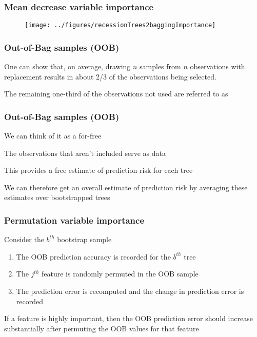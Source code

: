\documentclass[12pt]{beamer}
\begin{document}
\begin{frame}[fragile]
\frametitle{Mean decrease variable importance}

\begin{figure}
\centering
\texttt{[image: ../figures/recessionTrees2baggingImportance]}
\end{figure}
\end{frame}

\begin{frame}
\frametitle{Out-of-Bag samples (OOB)}
One can show that, on average, drawing $n$ samples from $n$ observations with replacement  results
in about 2/3 of the observations being selected.

\vsp
The remaining one-third of the observations not used are referred to as 
\end{frame}

\begin{frame}
\frametitle{Out-of-Bag samples (OOB)}


We can think of it as a for-free 


\vsp
The observations that aren't included serve as  data

\vsp
This provides a free estimate of prediction risk for each tree

\vsp
We can therefore get an overall estimate of prediction risk by averaging these estimates over  bootstrapped trees
\end{frame}


\begin{frame}[fragile]
\frametitle{Permutation variable importance}
Consider the $b^{th}$ bootstrap sample

\begin{enumerate}
\item The OOB prediction accuracy is recorded for the $b^{th}$ tree
\item The $j^{th}$ feature is randomly permuted in the OOB sample

\item The prediction error is recomputed and the change in prediction error is recorded

\end{enumerate}
\vsp

 If a feature is highly important, then the OOB prediction error should increase substantially
after permuting the OOB values for that feature

\end{frame}
\end{document}
